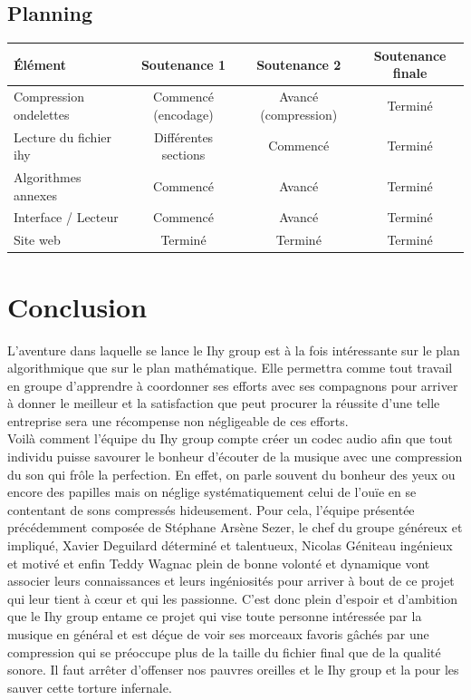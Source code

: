 \newpage

\begin{landscape}
	\subsection{Planning}
	\begin{center}
	\begin{tabular}{||l||c|c|c||}
		\hline
		\hline
		Élément & Soutenance 1 & Soutenance 2 & Soutenance finale \\
		\hline
		\hline
		Compression   ondelettes   &   Commencé   (encodage)   &  Avancé
		(compression) & Terminé \\
		\hline
		Lecture  du fichier  ihy &  Différentes  sections  &  Commencé &
		Terminé \\
		\hline
		Algorithmes annexes & Commencé & Avanc\'e & Terminé \\
		\hline
		Interface / Lecteur & Commenc\'e & Avancé & Terminé \\
		\hline
		Site web & Terminé & Terminé & Terminé \\
		\hline
		\hline
	\end{tabular}
	\end{center}
\end{landscape}

\newpage

\section*{Conclusion}
L'aventure  dans  laquelle  se  lance  le   Ihy  group  est  à  la  fois
intéressante sur  le plan  algorithmique que  sur le  plan mathématique.
Elle permettra comme tout travail en groupe d'apprendre à coordonner ses
efforts avec  ses compagnons  pour arriver  à donner  le meilleur  et la
satisfaction que peut  procurer la réussite d'une  telle entreprise sera
une récompense non négligeable de ces efforts.\\
Voilà comment l'équipe du Ihy group compte créer un codec audio afin que
tout individu  puisse savourer le  bonheur d'écouter de  la musique avec
une compression  du son  qui frôle  la perfection.  En  effet,  on parle
souvent du bonheur  des  yeux  ou  encore  des  papilles mais on néglige
systématiquement celui  de l'ouïe  en se  contentant de  sons compressés
hideusement.  Pour cela,  l'équipe  présentée  précédemment  composée de
Stéphane Arsène Sezer,  le chef  du groupe généreux et impliqué,  Xavier
Deguilard déterminé et talentueux,  Nicolas Géniteau ingénieux et motivé
et enfin Teddy Wagnac plein de  bonne volonté et dynamique vont associer
leurs  connaissances et  leurs ingéniosités  pour arriver  à bout  de ce
projet qui  leur tient à cœur  et qui  les passionne.  C'est  donc plein
d'espoir et d'ambition que le Ihy  group entame ce projet qui vise toute
personne intéressée par  la musique en général et est  déçue de voir ses
morceaux favoris gâchés par une compression  qui se préoccupe plus de la
taille du fichier  final  que  de  la  qualité  sonore.  Il faut arrêter
d'offenser nos  pauvres oreilles et le  Ihy group et la  pour les sauver
cette torture infernale.
